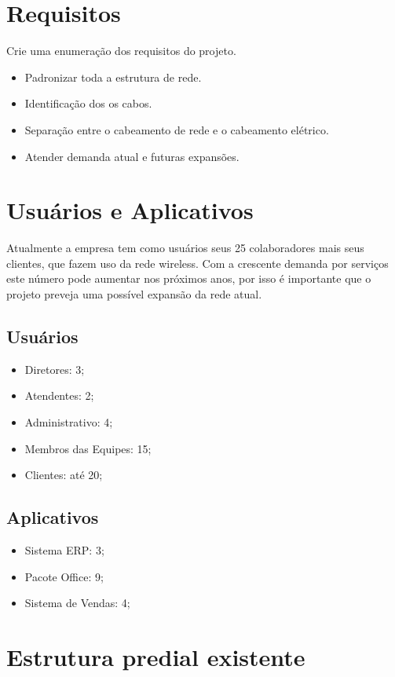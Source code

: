 \documentclass[	DIV=calc,%
paper=a4,%
fontsize=12pt,%
onecolumn]{scrartcl}	 					%
\begin{document}
	\section{Requisitos}
	Crie uma enumeração dos requisitos do projeto.
	\begin{itemize}
		\item Padronizar toda a estrutura de rede.
		\item Identificação dos os cabos.
		\item Separação entre o cabeamento de rede e o cabeamento elétrico.
		\item Atender demanda atual e futuras expansões.				
	\end{itemize}	
	
	\section{Usuários e Aplicativos}
	Atualmente a empresa tem como usuários seus 25 colaboradores mais seus clientes, que fazem uso da rede wireless. Com a crescente demanda por serviços este número pode aumentar nos próximos anos, por isso é importante que o projeto preveja uma possível expansão da rede atual.
	
	
	\subsection{Usuários}
	\begin{itemize}
		\item Diretores: 3;
		\item Atendentes: 2;
		\item Administrativo: 4;
		\item Membros das Equipes: 15;
		\item Clientes: até 20;
	\end{itemize}
	\subsection{Aplicativos}
	\begin{itemize}
		\item Sistema ERP: 3;
		\item Pacote Office: 9;
		\item Sistema de Vendas: 4;
	\end{itemize}
	
	\section{Estrutura predial existente}
	
\end{document}
